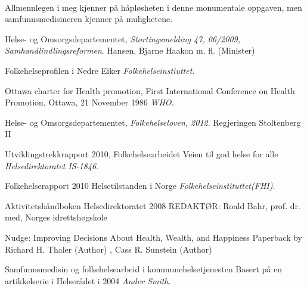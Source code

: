 \documentclass[11pt]{memoir} %
\begin{document}
		\paragraph{}
			Allmennlegen i meg kjenner på håpløsheten i denne monumentale oppgaven, men samfunnsmedisineren kjenner på mulighetene. 

 \renewcommand{\bibname}{Kilder:}
              \begin{thebibliography}{99}

                  Helse- og Omsorgsdepartementet,
                  \emph{Stortingsmelding 47, 06/2009, Samhandlindlingsreformen}.
                  Hansen, Bjarne Haakon m. fl. (Minister)

                  Folkehelseprofilen i Nedre Eiker
                  \emph{Folkehelseinstiuttet}.
                  
                  Ottawa charter for Health promotion,
                  First International Conference on Health Promotion, Ottawa, 21 November 1986
                  \emph{WHO}.

                  Helse- og Omsorgsdepartementet,
                  \emph{Folkehelseloven, 2012}.
                  Regjeringen Stoltenberg II


                  Utviklingstrekkrapport 2010, Folkehelsearbeidet
                  Veien til god helse for alle
                  \emph{Helsedirektoratet IS-1846}.

                  Folkehelserapport 2010
                  Helsetilstanden i Norge
                  \emph{Folkehelseinstituttet(FHI)}.

                  Aktivitetshåndboken
                  Helsedirektoratet 2008
                  REDAKTØR: Roald Bahr, prof. dr. med, Norges idrettshøgskole
                 
                 	Nudge: Improving Decisions About Health, Wealth, and Happiness Paperback
					by Richard H. Thaler (Author) , Cass R. Sunstein  (Author)
                 
                  Samfunnsmedisin og folkehelsearbeid i kommunehelsetjenesten
                  Basert på en artikkelserie i Helserådet i 2004
                  \emph{Ander Smith}.

\end{thebibliography}
\end{document}
